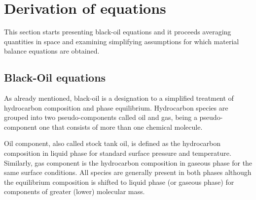 \documentclass[authoryear,preprint,review,12pt]{elsarticle}
\begin{document}
%
%
%
%
%

\section{Derivation of equations}

This section starts presenting black-oil equations and it proceeds averaging quantities in space and examining simplifying assumptions for which material balance equations are obtained.

\subsection{Black-Oil equations}

As already mentioned, black-oil is a designation to a simplified treatment of hydrocarbon composition and phase equilibrium. Hydrocarbon species are grouped into two pseudo-components called oil and gas, being a pseudo-component one that consists of more than one chemical molecule.

Oil component, also called stock tank oil, is defined as the hydrocarbon composition in liquid phase for standard surface pressure and temperature. Similarly, gas component is the hydrocarbon composition in gaseous phase for the same surface conditions. All species are generally present in both phases although the equilibrium composition is shifted to liquid phase (or gaseous phase) for components of greater (lower) molecular mass.
\end{document}
